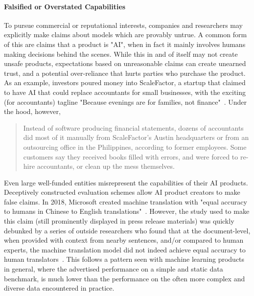 \documentclass[acmconf,manuscript,screen,natbib=true]{acmart}
\begin{document}
\paragraph{Falsified or Overstated Capabilities}

To pursue commercial or reputational interests, companies and researchers may explicitly make claims about models which are provably untrue. A common form of this are claims that a product is "AI", when in fact it mainly involves %
humans making decisions behind the scenes.
While this in and of itself may not create unsafe products, expectations based on unreasonable claims can create unearned trust, and a potential over-reliance that hurts parties who purchase the product. As an example, investors poured money into ScaleFactor, a startup that claimed to have AI that could replace accountants for small businesses, with the exciting (for accountants) tagline "Because evenings are for families, not finance"~\cite{scalefactor}. Under the hood, however, 

\blockquote{Instead of software producing financial statements, dozens of accountants did most of it manually from ScaleFactor’s Austin headquarters or from an outsourcing office in the Philippines, according to former employees. Some customers say they received books filled with errors, and were forced to re-hire accountants, or clean up the mess themselves.~\cite{scalefactor}
}%

Even large well-funded entities misrepresent the capabilities of their AI products. Deceptively constructed evaluation schemes allow AI product creators to make false claims. In 2018, Microsoft created machine translation with "equal accuracy to humans in Chinese to English translations"~\cite{Translator2018-ki}. However, the study used to make this claim (still prominently displayed in press release materials) was quickly debunked by a series of outside researchers who found that at the document-level, when provided with context from nearby sentences, and/or compared to human experts, the machine translation model did not indeed achieve equal accuracy to human %
translators~\cite{Toral2018-wn,Laubli2018-sn}. This follows a pattern seen with machine learning products in general, where the advertised performance on a simple and static data benchmark, is much lower than the performance on the often more complex and diverse data encountered in practice. %
\end{document}
